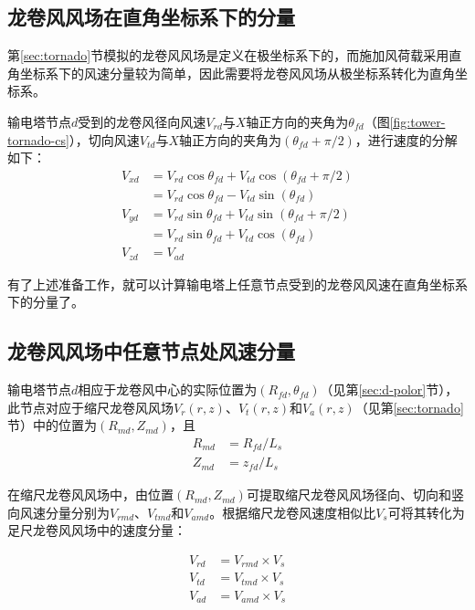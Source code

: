 \subsection{龙卷风风场在直角坐标系下的分量}\label{sec:cs}
第\ref{sec:tornado}节模拟的龙卷风风场是定义在极坐标系下的，而施加风荷载采用直角坐标系下的风速分量较为简单，因此需要将龙卷风风场从极坐标系转化为直角坐标系。

输电塔节点$d$受到的龙卷风径向风速$V_{rd}$与$X$轴正方向的夹角为$\theta_{fd}$（图\ref{fig:tower-tornado-cs}），切向风速$V_{td}$与$X$轴正方向的夹角为$(\theta_{fd}+\pi/2)$，进行速度的分解如下：
\begin{equation}
\begin{split}
  V_{xd} & = V_{rd} \cos\theta_{fd} + V_{td} \cos(\theta_{fd}+\pi/2) \\
         & = V_{rd} \cos\theta_{fd} - V_{td} \sin(\theta_{fd}) \\
  V_{yd} & = V_{rd} \sin\theta_{fd} + V_{td} \sin(\theta_{fd}+\pi/2) \\
         & = V_{rd} \sin\theta_{fd} + V_{td} \cos(\theta_{fd}) \\   
  V_{zd} & = V_{ad}  
\end{split}
\end{equation}

有了上述准备工作，就可以计算输电塔上任意节点受到的龙卷风风速在直角坐标系下的分量了。

\subsection{龙卷风风场中任意节点处风速分量}
输电塔节点$d$相应于龙卷风中心的实际位置为$(R_{fd}, \theta_{fd})$（见第\ref{sec:d-polor}节），此节点对应于缩尺龙卷风风场$V_r(r,z)$、$V_t(r,z)$和$V_a(r,z)$（见第\ref{sec:tornado}节）中的位置为$(R_{md}, Z_{md})$，且
\begin{equation}
\begin{split}
  R_{md} & = R_{fd} / L_s \\
  Z_{md} & = z_{fd} / L_s
\end{split}
\end{equation}

在缩尺龙卷风风场中，由位置$(R_{md}, Z_{md})$可提取缩尺龙卷风风场径向、切向和竖向风速分量分别为$V_{rmd}$、$V_{tmd}$和$V_{amd}$。根据缩尺龙卷风速度相似比$V_s$可将其转化为足尺龙卷风风场中的速度分量：

\begin{equation}
\begin{split}
  V_{rd} &= V_{rmd} \times V_s \\
  V_{td} &= V_{tmd} \times V_s \\
  V_{ad} &= V_{amd} \times V_s
\end{split}
\end{equation}

